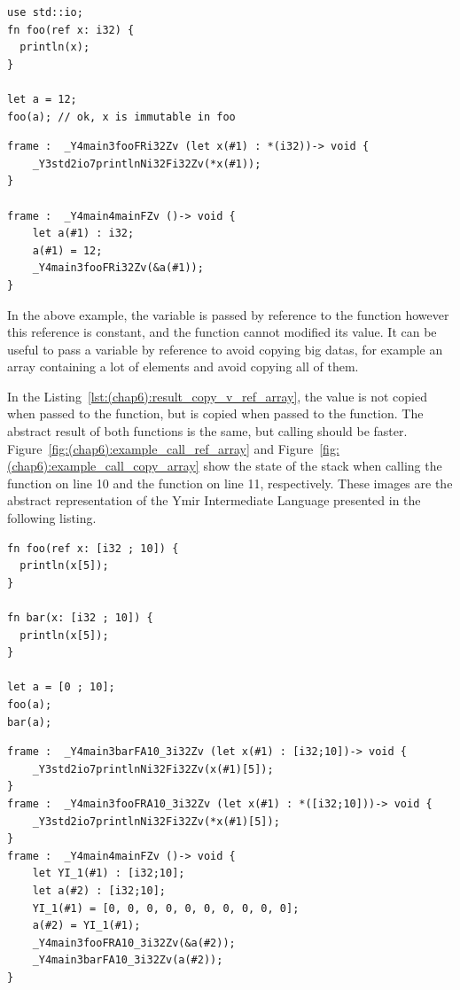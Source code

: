 \begin{lstlisting}[style=coloredverbatim]
use std::io;
fn foo(ref x: i32) {
  println(x);
}

let a = 12;
foo(a); // ok, x is immutable in foo
\end{lstlisting}

\begin{lstlisting}[style=lyilVerb]
frame :  _Y4main3fooFRi32Zv (let x(#1) : *(i32))-> void {
    _Y3std2io7printlnNi32Fi32Zv(*x(#1));
}

frame :  _Y4main4mainFZv ()-> void {
    let a(#1) : i32;
    a(#1) = 12;
    _Y4main3fooFRi32Zv(&a(#1));
}
\end{lstlisting}

In the above example, the variable  is passed by reference to the
function  however this reference is constant, and the function
 cannot modified its value. It can be useful to pass a variable by
reference to avoid copying big datas, for example an array containing a lot of
elements and avoid copying all of them.



In the Listing~\ref{lst:(chap6):result_copy_v_ref_array}, the value is not copied when passed to the 
function, but is copied when passed to the  function. The abstract
result of both functions is the same, but calling  should be faster.
Figure~\ref{fig:(chap6):example_call_ref_array} and
Figure~\ref{fig:(chap6):example_call_copy_array} show the state of the stack when
calling the  function on line 10 and the  function on
line 11, respectively. These images are the abstract representation of the Ymir
Intermediate Language presented in the following listing.

\begin{lstlisting}[style=coloredverbatim, label=lst:(chap6):result_copy_v_ref_array, caption=Example of passing an array by reference vs. by value]
fn foo(ref x: [i32 ; 10]) {
  println(x[5]);
}

fn bar(x: [i32 ; 10]) {
  println(x[5]);
}

let a = [0 ; 10];
foo(a);
bar(a);
\end{lstlisting}

\begin{lstlisting}[style=lyilVerb, caption=YIL result of Listing~\ref{lst:(chap6):result_copy_v_ref_array}]
frame :  _Y4main3barFA10_3i32Zv (let x(#1) : [i32;10])-> void {
    _Y3std2io7printlnNi32Fi32Zv(x(#1)[5]);
}
frame :  _Y4main3fooFRA10_3i32Zv (let x(#1) : *([i32;10]))-> void {
    _Y3std2io7printlnNi32Fi32Zv(*x(#1)[5]);
}
frame :  _Y4main4mainFZv ()-> void {
    let YI_1(#1) : [i32;10];
    let a(#2) : [i32;10];
    YI_1(#1) = [0, 0, 0, 0, 0, 0, 0, 0, 0, 0];
    a(#2) = YI_1(#1);
    _Y4main3fooFRA10_3i32Zv(&a(#2));
    _Y4main3barFA10_3i32Zv(a(#2));
}
\end{lstlisting}


